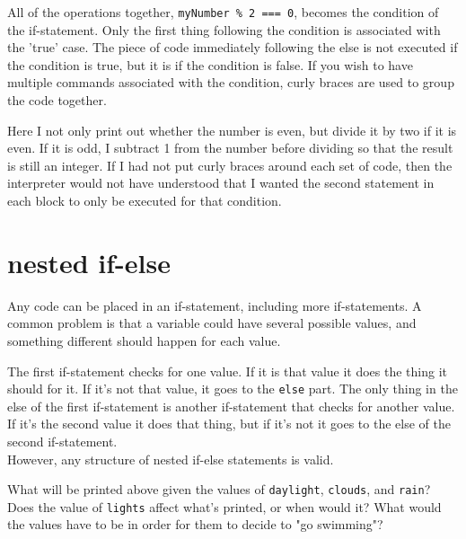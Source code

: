 
All of the operations together, \texttt{myNumber \% 2 === 0}, becomes the condition of the if-statement. Only the first thing following the condition is associated with the 'true' case. The piece of code immediately following the else is not executed if the condition is true, but it is if the condition is false. If you wish to have multiple commands associated with the condition, curly braces are used to group the code together.\\


Here I not only print out whether the number is even, but divide it by two if it is even. If it is odd, I subtract 1 from the number before dividing so that the result is still an integer. If I had not put curly braces around each set of code, then the interpreter would not have understood that I wanted the second statement in each block to only be executed for that condition.\\

\section{nested if-else}

Any code can be placed in an if-statement, including more if-statements. A common problem is that a variable could have several possible values, and something different should happen for each value.


The first if-statement checks for one value. If it is that value it does the thing it should for it. If it's not that value, it goes to the \texttt{else} part. The only thing in the else of the first if-statement is another if-statement that checks for another value. If it's the second value it does that thing, but if it's not it goes to the else of the second if-statement.\\

However, any structure of nested if-else statements is valid.


What will be printed above given the values of \texttt{daylight}, \texttt{clouds}, and \texttt{rain}? Does the value of \texttt{lights} affect what's printed, or when would it? What would the values have to be in order for them to decide to "go swimming"?\\


